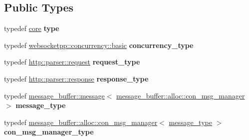 \subsection*{Public Types}
\begin{DoxyCompactItemize}
\item 
typedef \hyperlink{structwebsocketpp_1_1config_1_1core}{core} {\bfseries type}\hypertarget{structwebsocketpp_1_1config_1_1core_a889847e774c23625d729b6668d4d0ec8}{}\label{structwebsocketpp_1_1config_1_1core_a889847e774c23625d729b6668d4d0ec8}

\item 
typedef \hyperlink{classwebsocketpp_1_1concurrency_1_1basic}{websocketpp\+::concurrency\+::basic} {\bfseries concurrency\+\_\+type}\hypertarget{structwebsocketpp_1_1config_1_1core_a894e9dea6f10e890ea21a687607c2f70}{}\label{structwebsocketpp_1_1config_1_1core_a894e9dea6f10e890ea21a687607c2f70}

\item 
typedef \hyperlink{classwebsocketpp_1_1http_1_1parser_1_1request}{http\+::parser\+::request} {\bfseries request\+\_\+type}\hypertarget{structwebsocketpp_1_1config_1_1core_a6b17eee7cb81f247afc8f3d7b3a3fc9e}{}\label{structwebsocketpp_1_1config_1_1core_a6b17eee7cb81f247afc8f3d7b3a3fc9e}

\item 
typedef \hyperlink{classwebsocketpp_1_1http_1_1parser_1_1response}{http\+::parser\+::response} {\bfseries response\+\_\+type}\hypertarget{structwebsocketpp_1_1config_1_1core_a08e9a1d498f9002cbabcb1102df6005b}{}\label{structwebsocketpp_1_1config_1_1core_a08e9a1d498f9002cbabcb1102df6005b}

\item 
typedef \hyperlink{classwebsocketpp_1_1message__buffer_1_1message}{message\+\_\+buffer\+::message}$<$ \hyperlink{classwebsocketpp_1_1message__buffer_1_1alloc_1_1con__msg__manager}{message\+\_\+buffer\+::alloc\+::con\+\_\+msg\+\_\+manager} $>$ {\bfseries message\+\_\+type}\hypertarget{structwebsocketpp_1_1config_1_1core_afb4c134e0a311beebe31a50458855279}{}\label{structwebsocketpp_1_1config_1_1core_afb4c134e0a311beebe31a50458855279}

\item 
typedef \hyperlink{classwebsocketpp_1_1message__buffer_1_1alloc_1_1con__msg__manager}{message\+\_\+buffer\+::alloc\+::con\+\_\+msg\+\_\+manager}$<$ \hyperlink{classwebsocketpp_1_1message__buffer_1_1message}{message\+\_\+type} $>$ {\bfseries con\+\_\+msg\+\_\+manager\+\_\+type}\hypertarget{structwebsocketpp_1_1config_1_1core_a9f19abdae7b74d1595b410ea47f3e0d8}{}\label{structwebsocketpp_1_1config_1_1core_a9f19abdae7b74d1595b410ea47f3e0d8}


\end{DoxyCompactItemize}
